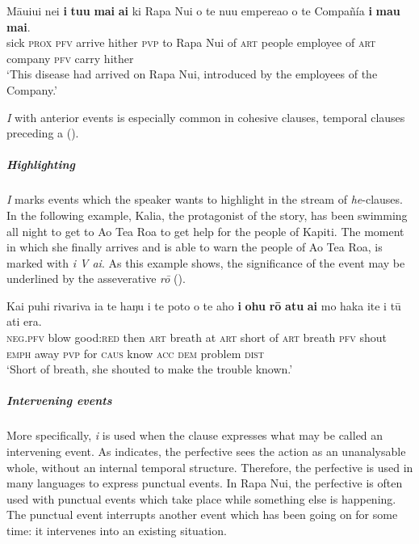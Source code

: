 \ea\label{ex:7.20}
\gll Māuiui nei \textbf{i} \textbf{tu{\ꞌ}u} \textbf{mai} \textbf{ai} ki Rapa Nui o te nu{\ꞌ}u empereao  o te Compañía \textbf{i} \textbf{ma{\ꞌ}u} \textbf{mai}.\\
sick \textsc{prox} \textsc{pfv} arrive hither \textsc{pvp} to Rapa Nui of \textsc{art} people employee  of \textsc{art} company \textsc{pfv} carry hither\\

\glt
‘This disease had arrived on Rapa Nui, introduced by the employees of the Company.’ \textstyleExampleref{[R250.084]} 
\z

\textit{I} with anterior events is especially common in cohesive clauses, temporal clauses preceding a  ().

\subparagraph{Highlighting} \textit{I} marks events which the speaker wants to highlight in the stream of \textit{he}{}-clauses. In the following example, Kalia, the protagonist of the story, has been swimming all night to get to Ao Tea Roa to get help for the people of Kapiti. The moment in which she finally arrives and is able to warn the people of Ao Tea Roa, is marked with \textit{i V ai}. As this example shows, the significance of the event may be underlined by the asseverative  \textit{rō} ().

\ea\label{ex:7.21}
\gll Kai puhi rivariva ia te haŋu {\ꞌ}i te poto o te aho  \textbf{i} \textbf{ohu} \textbf{rō} \textbf{atu} \textbf{ai} mo haka {\ꞌ}ite i tū {\ꞌ}ati era.\\
\textsc{neg.pfv} blow good:\textsc{red} then \textsc{art} breath at \textsc{art} short of \textsc{art} breath  \textsc{pfv} shout \textsc{emph} away \textsc{pvp} for \textsc{caus} know \textsc{acc} \textsc{dem} problem \textsc{dist}\\

\glt 
‘Short of breath, she shouted to make the trouble known.’ \textstyleExampleref{[R347.128]} 
\z

\subparagraph{Intervening events} More specifically, \textit{i} is used when the clause expresses what may be called an intervening event. As \citet[3]{Comrie1976} indicates, the perfective sees the action as an unanalysable whole, without an internal temporal structure. Therefore, the perfective is used in many languages to express punctual events. In Rapa Nui, the perfective is often used with punctual events which take place while something else is happening. The punctual event interrupts another event which has been going on for some time: it intervenes into an existing situation.

